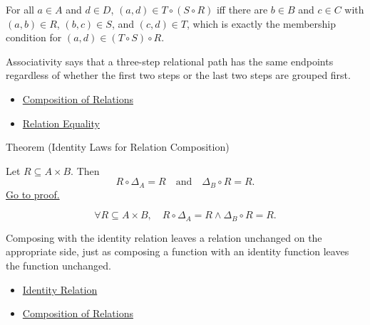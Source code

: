\begin{remark*}
For all $a\in A$ and $d\in D$, $(a,d)\in T\circ(S\circ R)$ iff there are
$b\in B$ and $c\in C$ with $(a,b)\in R$, $(b,c)\in S$, and $(c,d)\in T$,
which is exactly the membership condition for $(a,d)\in (T\circ S)\circ R$.
\end{remark*}

\begin{remark*}[Interpretation]
Associativity says that a three-step relational path has the same endpoints
regardless of whether the first two steps or the last two steps are grouped
first.
\end{remark*}

\begin{dependencies}
\begin{itemize}
  \item \hyperref[def:relation-composition]{Composition of Relations}
  \item \hyperref[def:relation-equality]{Relation Equality}
\end{itemize}
\end{dependencies}

\begin{theorembox}{Theorem (Identity Laws for Relation Composition)}
\begin{theorem}\label{thm:relation-composition-id}
Let $R\subseteq A\times B$. Then
\[
R\circ\Delta_A=R
\quad\text{and}\quad
\Delta_B\circ R=R.
\]
\hyperref[prf:relation-composition-id]{Go to proof.}
\end{theorem}
\end{theorembox}

\begin{remark*}
\[
  \forall R\subseteq A\times B,\quad
  R\circ\Delta_A=R
  \wedge
  \Delta_B\circ R=R.
\]
\end{remark*}

\begin{remark*}[Interpretation]
Composing with the identity relation leaves a relation unchanged on the
appropriate side, just as composing a function with an identity function leaves
the function unchanged.
\end{remark*}

\begin{dependencies}
\begin{itemize}
  \item \hyperref[def:relation-identity]{Identity Relation}
  \item \hyperref[def:relation-composition]{Composition of Relations}
\end{itemize}
\end{dependencies}

